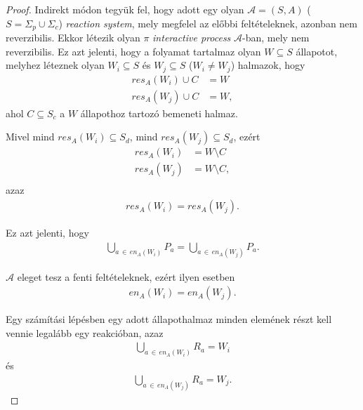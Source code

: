 \documentclass[12pt]{article}
\theoremstyle{definition}
\theoremstyle{remark}
\theoremstyle{plain}
\theoremstyle{plain}
\newcommand{\en}{\textit{en}}
\newcommand{\res}{\textit{res}}
\begin{document}
    \begin{proof}
        Indirekt módon tegyük fel, hogy adott egy olyan $\mathscr{A}=(S, A)$ ($S = \Sigma_{p} \cup \Sigma_{c}$) \textit{reaction system}, mely megfelel az előbbi feltételeknek, azonban nem reverzibilis. Ekkor létezik olyan $\pi$ \textit{interactive process} $\mathscr{A}$-ban, mely nem reverzibilis. Ez azt jelenti, hogy a folyamat tartalmaz olyan $W \subseteq S$ állapotot, melyhez léteznek olyan $W_{i} \subseteq S$ és $W_{j} \subseteq S$ ($W_{i} \neq W_{j}$) halmazok, hogy
        \begin{align*}
            \res_{A}(W_{i}) \cup C &= W \\
            \res_{A}(W_{j}) \cup C &= W,
        \end{align*}
        ahol $C \subseteq S_{c}$ a $W$ állapothoz tartozó bemeneti halmaz. 
        
        Mivel mind $\res_{A}(W_{i}) \subseteq S_{d}$, mind $\res_{A}(W_{j}) \subseteq S_{d}$, ezért
        \begin{align*}
            \res_{A}(W_{i}) &= W \setminus C \\
            \res_{A}(W_{j}) &= W \setminus C, \\
        \end{align*}
        azaz
        \begin{align*}
            \res_{A}(W_{i}) = \res_{A}(W_{j}).
        \end{align*}

        Ez azt jelenti, hogy
        \begin{align*}
            \bigcup\limits_{a \,\in\, \en_{A}(W_{i})}P_{a} = \bigcup\limits_{a \,\in\, \en_{A}(W_{j})}P_{a}.
        \end{align*}

        $\mathscr{A}$ eleget tesz a fenti feltételeknek, ezért ilyen esetben
        \begin{align*}
            \en_{A}(W_{i}) = \en_{A}(W_{j}).
        \end{align*}

        Egy számítási lépésben egy adott állapothalmaz minden elemének részt kell vennie legalább egy reakcióban, azaz
        \begin{align*}
            \bigcup\limits_{a \,\in\, \en_{A}(W_{i})} R_{a} = W_{i}
        \end{align*}
        és
        \begin{align*}
            \bigcup\limits_{a \,\in\, \en_{A}(W_{j})} R_{a} = W_{j}.
        \end{align*}


\end{proof}
\end{document}
